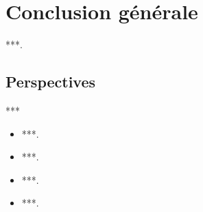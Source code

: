 \chapter*{Conclusion générale}
{}

***.

\section*{Perspectives}
***

\begin{itemize}[label = \scriptsize$\blacktriangleright$]
    \item ***.
    \item ***.
    \item ***.
    \item ***.
\end{itemize}